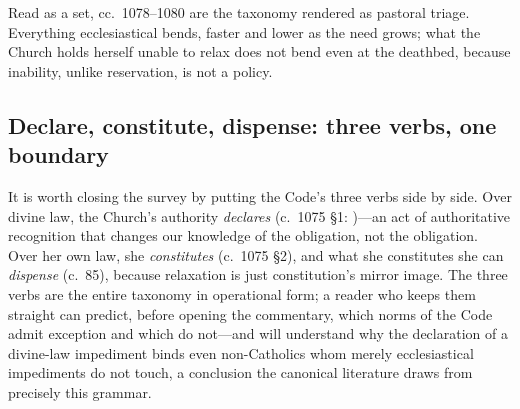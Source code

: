 Read as a set, cc.~1078--1080 are the taxonomy rendered as pastoral triage. Everything ecclesiastical bends, faster and lower as the need grows; what the Church holds herself unable to relax does not bend even at the deathbed, because inability, unlike reservation, is not a policy.

\subsection{Declare, constitute, dispense: three verbs, one boundary}

It is worth closing the survey by putting the Code's three verbs side by side. Over divine law, the Church's authority \emph{declares} (c.~1075 §1: )---an act of authoritative recognition that changes our knowledge of the obligation, not the obligation. Over her own law, she \emph{constitutes} (c.~1075 §2), and what she constitutes she can \emph{dispense} (c.~85), because relaxation is just constitution's mirror image. The three verbs are the entire taxonomy in operational form; a reader who keeps them straight can predict, before opening the commentary, which norms of the Code admit exception and which do not---and will understand why the declaration of a divine-law impediment binds even non-Catholics whom merely ecclesiastical impediments do not touch, a conclusion the canonical literature draws from precisely this grammar.
